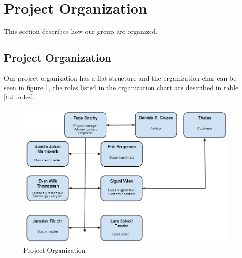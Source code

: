 \section{Project Organization}
This section describes how our group are organized.

\subsection{Project Organization}
Our project organization has a flat structure and the organization char can be seen in figure \ref{fig:orgchart}, the roles listed in the organization chart are described in table \ref{tab:roles}. \newline
\\
\begin{figure}[here]
\includegraphics[scale=0.45]{./planning/img/organization.png}
\caption{Project Organization}
\label{fig:orgchart}
\end{figure}

